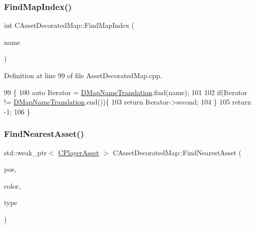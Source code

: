 \subsubsection{\texorpdfstring{Find\+Map\+Index()}{FindMapIndex()}}
{\footnotesize\ttfamily int C\+Asset\+Decorated\+Map\+::\+Find\+Map\+Index (\begin{DoxyParamCaption}\item[{const std\+::string \&}]{name }\end{DoxyParamCaption})\hspace{0.3cm}{\ttfamily [static]}}



Definition at line 99 of file Asset\+Decorated\+Map.\+cpp.


\begin{DoxyCode}
99                                                          \{
100     \textcolor{keyword}{auto} Iterator = \hyperlink{classCAssetDecoratedMap_afe82d461911e52b7e088da903166f1b3}{DMapNameTranslation}.find(name);
101     
102     \textcolor{keywordflow}{if}(Iterator != \hyperlink{classCAssetDecoratedMap_afe82d461911e52b7e088da903166f1b3}{DMapNameTranslation}.end())\{
103         \textcolor{keywordflow}{return} Iterator->second;
104     \}
105     \textcolor{keywordflow}{return} -1;
106 \}
\end{DoxyCode}
\hypertarget{classCAssetDecoratedMap_a37f9ffaf70ea515c422544a52dd80483}{}\label{classCAssetDecoratedMap_a37f9ffaf70ea515c422544a52dd80483} 
\subsubsection{\texorpdfstring{Find\+Nearest\+Asset()}{FindNearestAsset()}}
{\footnotesize\ttfamily std\+::weak\+\_\+ptr$<$ \hyperlink{classCPlayerAsset}{C\+Player\+Asset} $>$ C\+Asset\+Decorated\+Map\+::\+Find\+Nearest\+Asset (\begin{DoxyParamCaption}\item[{const \hyperlink{classCPosition}{C\+Position} \&}]{pos,  }\item[{\hyperlink{GameDataTypes_8h_aafb0ca75933357ff28a6d7efbdd7602f}{E\+Player\+Color}}]{color,  }\item[{\hyperlink{GameDataTypes_8h_a5600d4fc433b83300308921974477fec}{E\+Asset\+Type}}]{type }\end{DoxyParamCaption})}




